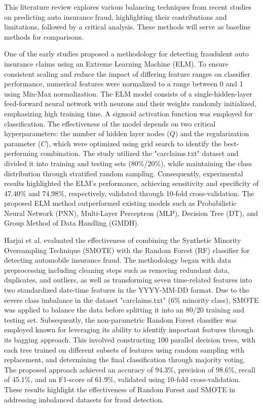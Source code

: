 \documentclass[twoside,11pt]{article}
\begin{document}
This literature review explores various balancing techniques from recent studies on predicting auto insurance fraud, highlighting their contributions and limitations, followed by a critical analysis. These methods will serve as baseline methods for comparisons.

One of the early studies \cite{Patel2019} proposed a methodology for detecting fraudulent auto insurance claims using an Extreme Learning Machine (ELM). To ensure consistent scaling and reduce the impact of differing feature ranges on classifier performance, numerical features were normalized to a range between 0 and 1 using Min-Max normalization. The ELM model consists of a single-hidden-layer feed-forward neural network with neurons and their weights randomly initialized, emphasizing high training time. A sigmoid activation function was employed for classification. The effectiveness of the model depends on two critical hyperparameters: the number of hidden layer nodes (\(Q\)) and the regularization parameter (\(C\)), which were optimized using grid search to identify the best-performing combination. The study utilized the "carclaims.txt" dataset and divided it into training and testing sets (80\%/20\%), while maintaining the class distribution through stratified random sampling. Consequently, experimental results highlighted the ELM's performance, achieving sensitivity and specificity of 47.40\% and 74.98\%, respectively, validated through 10-fold cross-validation. The proposed ELM method outperformed existing models such as Probabilistic Neural Network (PNN), Multi-Layer Perceptron (MLP), Decision Tree (DT), and Group Method of Data Handling (GMDH).


Harjai et al. \cite{Harjai2019} evaluated the effectiveness of combining the Synthetic Minority Oversampling Technique (SMOTE) with the Random Forest (RF) classifier for detecting automobile insurance fraud. The methodology began with data preprocessing including cleaning steps such as removing redundant data, duplicates, and outliers, as well as transforming seven time-related features into two standardized date-time features in the YYYY-MM-DD format. Due to the severe class imbalance in the dataset "carclaims.txt" (6\% minority class), SMOTE was applied to balance the data before splitting it into an 80/20 training and testing set. Subsequently, the non-parametric Random Forest classifier was employed known for leveraging its ability to identify important features through its bagging approach. This involved constructing 100 parallel decision trees, with each tree trained on different subsets of features using random sampling with replacement, and determining the final classification through majority voting. The proposed approach achieved an accuracy of 94.3\%, precision of 98.6\%, recall of 45.1\%, and an F1-score of 61.9\%, validated using 10-fold cross-validation. These results highlight the effectiveness of Random Forest and SMOTE in addressing imbalanced datasets for fraud detection.
\end{document}
